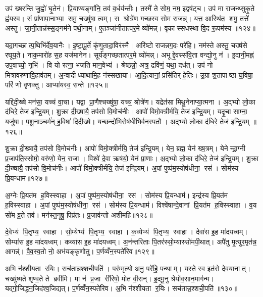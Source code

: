 उप॑ ख्षरन्ति जु॒ह्वो॑ घृ॒तेन॑। प्रि॒याण्यङ्गा॑नि॒ तव॑ व॒र्धय॑न्तीः। तस्मै॑ ते सोम॒ नम॒ इद्वष॑ट्च। उप॑ मा राजन्थ्सुकृ॒ते ह्व॑यस्व। सं प्रा॑णापा॒नाभ्या॒ समु॒ चख्षु॑षा॒ त्वम्। स श्रोत्रे॑ण गच्छस्व सोम राजन्न्। यत्त॒ आस्थि॑त॒ शमु॒ तत्ते॑ अस्तु। जा॒नी॒तान्न॑स्स॒ङ्गम॑ने पथी॒नाम्। ए॒तञ्जा॑नीतात्पर॒मे व्यो॑मन्न्। वृकास्सधस्था वि॒द रू॒पम॑स्य ॥१२४॥

यदा॒गच्छात्प॒थिभि॑र्देव॒यानैः। इ॒ष्टा॒पू॒र्ते कृ॑णुतादा॒विर॑स्मै। अरि॑ष्टो राजन्नग॒दः परे॑हि। नम॑स्ते अस्तु॒ चख्ष॑से रघूय॒ते। नाक॒मारो॑ह स॒ह यज॑मानेन। सूर्य॑ङ्गच्छतात्पर॒मे व्यो॑मन्न्। अभूद्दे॒वस्स॑वि॒ता वन्द्यो॒नु न॑। इ॒दानी॒मह्न॑ उप॒वाच्यो॒ नृभि॑। वि यो रत्ना॒ भज॑ति मान॒वेभ्य॑। श्रेष्ठ॑न्नो॒ अत्र॒ द्रवि॑णं॒ यथा॒ दध॑त्। उप॑ नो मित्रावरुणावि॒हाव॑तम्। अ॒न्वादीध्याथामि॒ह न॑स्सखाया। आ॒दि॒त्यानां॒ प्रसि॑तिर् हे॒तिः। उ॒ग्रा श॒तापाष्ठा घ॒विषा॒ परि॑ णो वृणक्तु। आप्या॑यस्व॒ सन्ते॥१२५॥\anuvakamend[त्मना॒ जाय॑मानोऽस्य॒ दध॒त्पञ्च॑ च]

यद्दि॑दी॒ख्षे मन॑सा॒ यच्च॑ वा॒चा। यद्वा प्रा॒णैश्चख्षु॑षा॒ यच्च॒ श्रोत्रे॑ण। यद्रेत॑सा मिथु॒नेनाप्या॒त्मना। अ॒द्भ्यो लो॒का द॑धिरे॒ तेज॑ इन्द्रि॒यम्। शु॒क्रा दी॒ख्षायै॒ तप॑सो वि॒मोच॑नीः। आपो॑ विमो॒क्त्रीर्मयि॒ तेज॑ इन्द्रि॒यम्। यदृ॒चा साम्ना॒ यजु॑षा। प॒शू॒नाञ्चर्म॑न् ह॒विषा॑ दिदी॒ख्षे। यच्छन्दो॑भि॒रोष॑धीभि॒र्वन॒स्पतौ। अ॒द्भ्यो लो॒का द॑धिरे॒ तेज॑ इन्द्रि॒यम् ॥१२६॥

शु॒क्रा दी॒ख्षायै॒ तप॑सो वि॒मोच॑नीः। आपो॑ विमो॒क्त्रीर्मयि॒ तेज॑ इन्द्रि॒यम्। येन॒ ब्रह्म॒ येन॑ ख्ष॒त्रम्। येनेन्द्रा॒ग्नी प्र॒जाप॑ति॒स्सोमो॒ वरु॑णो॒ येन॒ राजा। विश्वे॑ दे॒वा ऋष॑यो॒ येन॑ प्रा॒णाः। अ॒द्भ्यो लो॒का द॑धिरे॒ तेज॑ इन्द्रि॒यम्। शु॒क्रा दी॒ख्षायै॒ तप॑सो वि॒मोच॑नीः। आपो॑ विमो॒क्त्रीर्मयि॒ तेज॑ इन्द्रि॒यम्। अ॒पां पुष्प॑म॒स्योष॑धीना॒ रस॑। सोम॑स्य प्रि॒यन्धाम॑॥१२७॥

अ॒ग्नेः प्रि॒यत॑म ह॒विस्स्वाहा। अ॒पां पुष्प॑म॒स्योष॑धीना॒ रस॑। सोम॑स्य प्रि॒यन्धाम॑। इन्द्र॑स्य प्रि॒यत॑म ह॒विस्स्वाहा। अ॒पां पुष्प॑म॒स्योष॑धीना॒ रस॑। सोम॑स्य प्रि॒यन्धाम॑। विश्वे॑षान्दे॒वानां प्रि॒यत॑म ह॒विस्स्वाहा। व॒य सो॑म व्र॒ते तव॑। मन॑स्त॒नूषु॒ पिप्र॑तः। प्र॒जाव॑न्तो अशीमहि॥१२८॥

दे॒वेभ्य॑ पि॒तृभ्य॒ स्वाहा। सो॒म्येभ्य॑ पि॒तृभ्य॒ स्वाहा। क॒व्येभ्य॑ पि॒तृभ्य॒ स्वाहा। देवा॑स इ॒ह मा॑दयध्वम्। सोम्या॑स इ॒ह मा॑दयध्वम्। कव्या॑स इ॒ह मा॑दयध्वम्। अ॒न॑न्तरिताः पि॒तर॑स्सो॒म्यास्सो॑मपी॒थात्। अपै॑तु मृ॒त्युर॒मृत॑न्न॒ आगन्न्॑। वै॒व॒स्व॒तो नो॒ अभ॑यङ्कृणोतु। प॒र्णव्वँन॒स्पते॑रिव॥१२९॥

अ॒भि न॑श्शीयता र॒यिः। सच॑तान्न॒श्शची॒पति॑। पर॑म्मृत्यो॒ अनु॒ परे॑हि॒ पन्थाम्। यस्ते॒ स्व इत॑रो देव॒यानात्। चख्षु॑ष्मते शृण्व॒ते ते ब्रवीमि। मा न॑ प्र॒जा री॑रिषो॒ मोत वी॒रान्। इ॒दमू॒नु श्रेयो॑व॒सान॒माग॑न्म। यद्गो॒जिद्ध॑न॒जिद॑श्व॒जिद्यत्। प॒र्णव्वँन॒स्पते॑रिव। अ॒भि न॑श्शीयता र॒यिः। सच॑तान्न॒श्शची॒पति॑॥१३०॥

